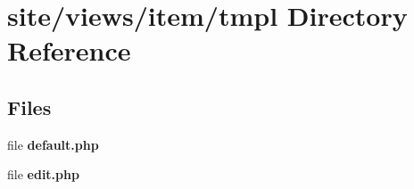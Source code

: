 \section{site/views/item/tmpl Directory Reference}
\label{dir_f194be7af2c534eccd67ff31f6e4751b}
\subsection*{Files}
\begin{DoxyCompactItemize}
\item 
file \textbf{ default.\+php}
\item 
file \textbf{ edit.\+php}
\end{DoxyCompactItemize}
